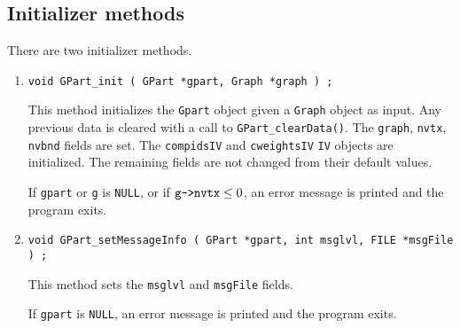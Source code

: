 \subsection{Initializer methods}
\label{subsection:GPart:proto:initializers}
\par
There are two initializer methods.
\par
\begin{enumerate}
\item
\begin{verbatim}
void GPart_init ( GPart *gpart, Graph *graph ) ;
\end{verbatim}
This method initializes the {\tt Gpart} object given a {\tt Graph}
object as input.
Any previous data is cleared with a call to 
{\tt GPart\_clearData()}.
The {\tt graph}, {\tt nvtx}, {\tt nvbnd} fields are set.
The {\tt compidsIV} and {\tt cweightsIV} {\tt IV} objects are 
initialized.
The remaining fields are not changed from their default values.
\par {}
If {\tt gpart} or {\tt g} is {\tt NULL},
or if $\mbox{\tt g->nvtx} \le 0$,
an error message is printed and the program exits.
\item
\begin{verbatim}
void GPart_setMessageInfo ( GPart *gpart, int msglvl, FILE *msgFile ) ;
\end{verbatim}
This method sets the {\tt msglvl} and {\tt msgFile} fields.
\par {}
If {\tt gpart} is {\tt NULL},
an error message is printed and the program exits.
\end{enumerate}
\par
